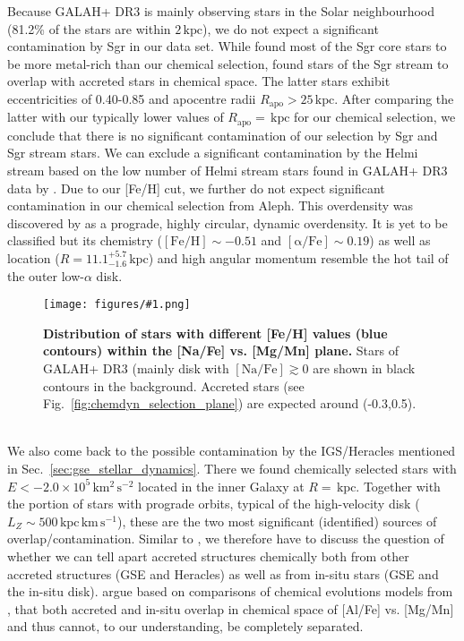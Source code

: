 \documentclass[fleqn,usenatbib]{mnras}
\newcommand{\kpc}{\,\mathrm{kpc}}	%
\newcommand{\kpckms}{\,\mathrm{kpc\,km\,s^{-1}}}	%
\newcommand{\kmkmss}{\,\mathrm{km^2\,s^{-2}}}	%
\newcommand{\codeicon}{{\faCloudDownload}}
\newcommand{\codelink}[1]{\href{https://github.com/svenbuder/Accreted-stars-in-GALAH-DR3/tree/main/figures/#1.ipynb}{\codeicon}\,\,}
\newcommand{\oscaption}[2]{\caption{#2 \codelink{#1}}}
\newcommand{\figurecolumnwidth}[3]{\begin{figure} \centering \texttt{[image: figures/\#1.png]}\oscaption{#2}{#3}\label{fig:#1} \end{figure}}
\begin{document}
Because GALAH+ DR3 is mainly observing stars in the Solar neighbourhood (81.2\% of the stars are within $2\kpc$), we do not expect a significant contamination by Sgr in our data set. While \citet{Hasselquist2017} found most of the Sgr core stars to be more metal-rich than our chemical selection, \citet{Hasselquist2019} found stars of the Sgr stream to overlap with accreted stars in chemical space. The latter stars exhibit eccentricities of 0.40-0.85 and apocentre radii $R_\text{apo} > 25\kpc$. After comparing the latter with our typically lower values of $R_\text{apo} = $$\kpc$ for our chemical selection, we conclude that there is no significant contamination of our selection by Sgr and Sgr stream stars. We can exclude a significant contamination by the Helmi stream based on the low number of Helmi stream stars found in GALAH+ DR3 data by \citet{Limberg2021}. Due to our [Fe/H] cut, we further do not expect significant contamination in our chemical selection from Aleph. This overdensity was discovered by \citet{Naidu2020} as a prograde, highly circular, dynamic overdensity. It is yet to be classified but its chemistry ($\mathrm{[Fe/H]} \sim -0.51$ and $\mathrm{[\alpha/Fe]} \sim 0.19$) as well as location ($R = 11.1_{-1.6}^{+5.7}\kpc$) and high angular momentum resemble the hot tail of the outer low-$\alpha$ disk.

\figurecolumnwidth{NaFe_MgMn_FeH_bins}{chronochemodynamic_comparison}{
\textbf{Distribution of stars with different [Fe/H] values (blue contours) within the [Na/Fe] vs. [Mg/Mn] plane.} Stars of GALAH+ DR3 (mainly disk with $\mathrm{[Na/Fe]} \gtrsim 0$ are shown in black contours in the background. Accreted stars (see Fig.~\ref{fig:chemdyn_selection_plane}) are expected around (-0.3,0.5).}

We also come back to the possible contamination by the IGS/Heracles \citep{Horta2021} mentioned in Sec.~\ref{sec:gse_stellar_dynamics}. There we found  chemically selected stars with $E < -2.0 \times 10^5 \kmkmss$ located in the inner Galaxy at $R = $$ \kpc$. Together with the portion of  stars with prograde orbits, typical of the high-velocity disk ($L_Z \sim 500\kpckms$), these are the two most significant (identified) sources of overlap/contamination. Similar to \citet{Horta2021}, we therefore have to discuss the question of whether we can tell apart accreted structures chemically both from other accreted structures (GSE and Heracles) as well as from in-situ stars (GSE and the in-situ disk). \citet{Horta2021} argue based on comparisons of chemical evolutions models from \citet{Andrews2017}, that both accreted and in-situ overlap in chemical space of [Al/Fe] vs. [Mg/Mn] and thus cannot, to our understanding, be completely separated.
\end{document}
